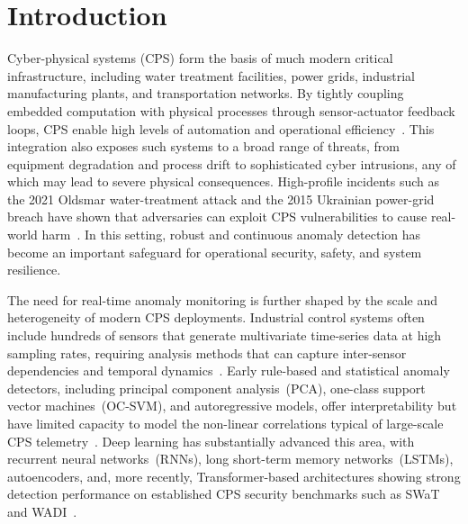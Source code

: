 \documentclass[pdflatex,sn-mathphys-num]{sn-jnl}
\theoremstyle{thmstyleone}
\theoremstyle{thmstyletwo}
\theoremstyle{thmstylethree}
\begin{document}


\maketitle

\section{Introduction}\label{sec: introduction}
Cyber-physical systems (CPS) form the basis of much modern critical infrastructure, including water treatment facilities, power grids, industrial manufacturing plants, and transportation networks. By tightly coupling embedded computation with physical processes through sensor-actuator feedback loops, CPS enable high levels of automation and operational efficiency~\cite{lee2008cyber,rajkumar2010cyber}. This integration also exposes such systems to a broad range of threats, from equipment degradation and process drift to sophisticated cyber intrusions, any of which may lead to severe physical consequences. High-profile incidents such as the 2021 Oldsmar water-treatment attack and the 2015 Ukrainian power-grid breach have shown that adversaries can exploit CPS vulnerabilities to cause real-world harm~\cite{case2016analysis}. In this setting, robust and continuous anomaly detection has become an important safeguard for operational security, safety, and system resilience.

The need for real-time anomaly monitoring is further shaped by the scale and heterogeneity of modern CPS deployments. Industrial control systems often include hundreds of sensors that generate multivariate time-series data at high sampling rates, requiring analysis methods that can capture inter-sensor dependencies and temporal dynamics~\cite{goh2016dataset,mathur2016swat}. Early rule-based and statistical anomaly detectors, including principal component analysis~(PCA), one-class support vector machines~(OC-SVM), and autoregressive models, offer interpretability but have limited capacity to model the non-linear correlations typical of large-scale CPS telemetry~\cite{chandola2009anomaly,scholkopf1999support}. Deep learning has substantially advanced this area, with recurrent neural networks~(RNNs), long short-term memory networks~(LSTMs), autoencoders, and, more recently, Transformer-based architectures showing strong detection performance on established CPS security benchmarks such as SWaT and WADI~\cite{hundman2018detecting,park2018multimodal,xu2022anomaly}.
\end{document}
